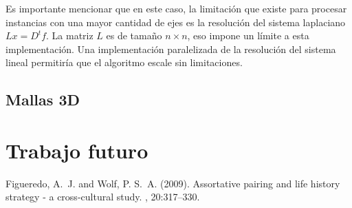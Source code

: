 \documentclass[10pt, a4paper, twocolumn]{article} %
\begin{document}
\smallskip

Es importante mencionar que en este caso, la limitación que existe para 
procesar instancias con una mayor cantidad de ejes es la resolución del 
sistema laplaciano $Lx = D^t f$. La matriz $L$ es de tamaño $n \times 
n$, eso impone un límite a esta implementación. Una implementación 
paralelizada de la resolución del sistema lineal permitiría que el 
algoritmo escale sin limitaciones.

\subsection{Mallas 3D}

\section{Trabajo futuro}


\begin{thebibliography}{99} %

Figueredo, A.~J. and Wolf, P. S.~A. (2009).
\newblock Assortative pairing and life history strategy - a cross-cultural
  study.
, 20:317--330.
 
\end{thebibliography}

\end{document}
